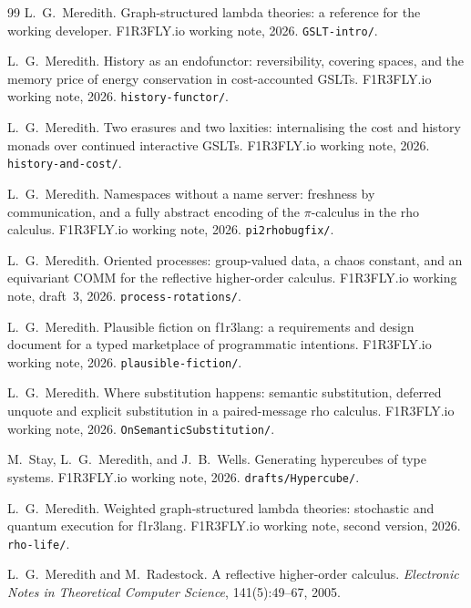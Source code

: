 \documentclass[11pt]{article}
\theoremstyle{branddef}
\theoremstyle{brandplain}
\theoremstyle{brandrem}
\newcommand{\flang}{\textsf{f1r3lang}}
\begin{document}
\begin{thebibliography}{99}
L.~G.~Meredith.
\newblock Graph-structured lambda theories: a reference for the working
developer.
\newblock F1R3FLY.io working note, 2026. \texttt{GSLT-intro/}.

L.~G.~Meredith.
\newblock History as an endofunctor: reversibility, covering spaces, and the
memory price of energy conservation in cost-accounted GSLTs.
\newblock F1R3FLY.io working note, 2026. \texttt{history-functor/}.

L.~G.~Meredith.
\newblock Two erasures and two laxities: internalising the cost and history
monads over continued interactive GSLTs.
\newblock F1R3FLY.io working note, 2026. \texttt{history-and-cost/}.

L.~G.~Meredith.
\newblock Namespaces without a name server: freshness by communication, and a
fully abstract encoding of the \(\pi\)-calculus in the rho calculus.
\newblock F1R3FLY.io working note, 2026. \texttt{pi2rhobugfix/}.

L.~G.~Meredith.
\newblock Oriented processes: group-valued data, a chaos constant, and an
equivariant COMM for the reflective higher-order calculus.
\newblock F1R3FLY.io working note, draft~3, 2026. \texttt{process-rotations/}.

L.~G.~Meredith.
\newblock Plausible fiction on \flang{}: a requirements and design document for
a typed marketplace of programmatic intentions.
\newblock F1R3FLY.io working note, 2026. \texttt{plausible-fiction/}.

L.~G.~Meredith.
\newblock Where substitution happens: semantic substitution, deferred unquote
and explicit substitution in a paired-message rho calculus.
\newblock F1R3FLY.io working note, 2026. \texttt{OnSemanticSubstitution/}.

M.~Stay, L.~G.~Meredith, and J.~B.~Wells.
\newblock Generating hypercubes of type systems.
\newblock F1R3FLY.io working note, 2026. \texttt{drafts/Hypercube/}.

L.~G.~Meredith.
\newblock Weighted graph-structured lambda theories: stochastic and quantum
execution for \flang{}.
\newblock F1R3FLY.io working note, second version, 2026. \texttt{rho-life/}.

L.~G.~Meredith and M.~Radestock.
\newblock A reflective higher-order calculus.
\newblock \emph{Electronic Notes in Theoretical Computer Science},
141(5):49--67, 2005.


\end{thebibliography}
\end{document}

